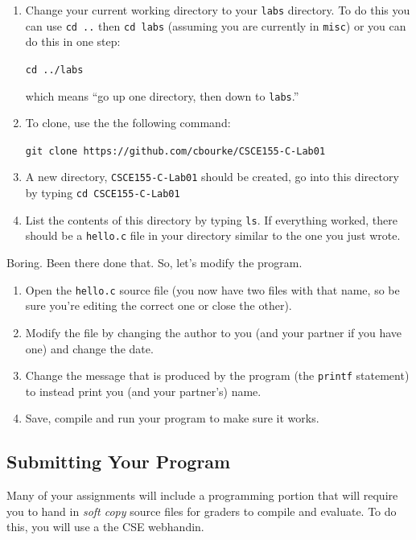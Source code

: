 \documentclass[12pt]{scrartcl}
\begin{document}
\begin{enumerate}
  \item Change your current working directory to your \texttt{labs}
  directory.  To do this you can use \texttt{cd ..} then 
  \texttt{cd labs} (assuming you are currently in \texttt{misc})
  or you can do this in one step: 
  
  \texttt{cd ../labs}
  
  which means ``go up one directory, then down to \texttt{labs}.''
  \item To clone, use the the following command:
  
  \texttt{git clone https://github.com/cbourke/CSCE155-C-Lab01}

  \item A new directory, \texttt{CSCE155-C-Lab01} should be created, 
  go into this directory by typing \texttt{cd CSCE155-C-Lab01}
  
  \item List the contents of this directory by typing \texttt{ls}.  
  If everything worked, there should be a \texttt{hello.c} 
  file in your directory similar to the one you just wrote.
\end{enumerate}

Boring.  Been there done that.  So, let's modify the program. 

\begin{enumerate}
  \item Open the \texttt{hello.c} source file (you now
  have two files with that name, so be sure you're editing the
  correct one or close the other).
  \item Modify the file by changing the author to you (and your 
  partner if you have one) and change the date.
  \item Change the message that is produced by the program (the
    \texttt{printf} statement) to instead
  	print you (and your partner's) name.
  \item Save, compile and run your program to make sure it works.
\end{enumerate}

\subsection{Submitting Your Program}

Many of your assignments will include a programming portion that will 
require you to hand in \emph{soft copy} source files for graders to compile 
and evaluate.  To do this, you will use a the CSE webhandin.
\end{document}
